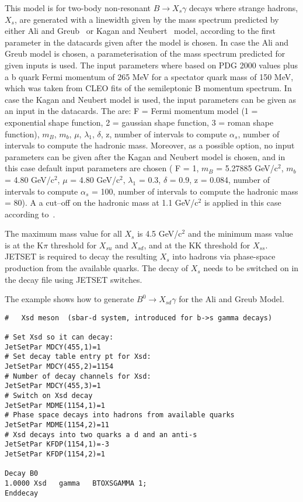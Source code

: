 \Expl
This model is for two-body non-resonant $B \rightarrow X_{s} \gamma$ decays 
where strange hadrons, $X_{s}$, are generated with a linewidth given by 
the mass spectrum predicted by either Ali and Greub~\cite{AliGreub} or
Kagan and Neubert~\cite{KaganNeubert} model, according to the first parameter in the datacards given after the 
model is chosen. In case the Ali and Greub
model is chosen, a parameterisation of the mass spectrum predicted for given inputs is used.
The input parameters where based on PDG 2000 values plus a 
b quark Fermi momentum of 265 MeV for a spectator quark mass of 150 MeV, 
which was taken from CLEO fits of the semileptonic B momentum spectrum.
In case the Kagan and Neubert model is used, the input parameters can be given as an input 
in the datacards. The are: F = Fermi momentum model (1 = exponential shape function, 
2 = gaussian shape function, 3 = roman shape function), $m_B$, $m_b$, $\mu$, $\lambda_1$, 
$\delta$, z, number of intervals to compute $\alpha_s$, number of intervals to
compute the hadronic mass. Moreover, as a possible option, no input parameters can be given after the
Kagan and Neubert model is chosen, and in this case default input parameters are chosen
( F = 1, $m_B$ = 5.27885 GeV/c$^2$, $m_b$ =  4.80 GeV/c$^2$, $\mu$ = 4.80 GeV/c$^2$, $\lambda_1$ = 0.3, 
$\delta$ = 0.9, z = 0.084, number of intervals to compute $\alpha_s$ = 100, number of intervals to
compute the hadronic mass = 80). A a cut--off on the hadronic mass at 1.1 GeV/c$^2$ is applied in this case 
according to~\cite{KaganNeubert}.

The maximum mass value for all $X_{s}$ is 4.5 GeV/c$^2$ and the minimum mass 
value is at the K$\pi$ threshold for $X_{su}$ and $X_{sd}$, and at the KK
threshold for $X_{ss}$. JETSET is required to decay the resulting $X_{s}$ 
into hadrons via phase-space production from the available quarks. The decay
of $X_{s}$ needs to be switched on in the decay file using JETSET switches.

\Example
\noindent The example shows how to generate $B^{0} \rightarrow X_{sd} \gamma$ for the Ali and Greub Model.
\begin{verbatim}
#   Xsd meson  (sbar-d system, introduced for b->s gamma decays)

# Set Xsd so it can decay:
JetSetPar MDCY(455,1)=1
# Set decay table entry pt for Xsd: 
JetSetPar MDCY(455,2)=1154
# Number of decay channels for Xsd:                
JetSetPar MDCY(455,3)=1
# Switch on Xsd decay
JetSetPar MDME(1154,1)=1
# Phase space decays into hadrons from available quarks
JetSetPar MDME(1154,2)=11
# Xsd decays into two quarks a d and an anti-s
JetSetPar KFDP(1154,1)=-3
JetSetPar KFDP(1154,2)=1

Decay B0
1.0000 Xsd   gamma   BTOXSGAMMA 1;
Enddecay
\end{verbatim}

